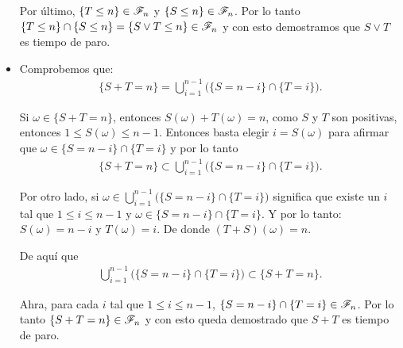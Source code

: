 \begin{itemize}
			Por último, ${\{ T \leq n \} \in \mathscr{F}_n}$ y ${\{ S \leq n \} \in \mathscr{F}_n}$. Por lo tanto	\\	
			${\{ T \leq n \} \cap \{ S \leq n\} = \{ S \vee T \leq n \} \in \mathscr{F}_n}$ y con esto demostramos que 
			${ S \vee T}$ es tiempo de paro.\\
			
		\item
			Comprobemos que:
			\begin{align}
				\{ S + T = n \} = \bigcup_{i = 1}^{n-1} \bigg( \{S = n - i\} \cap \{T = i\} \bigg).
			\end{align}
			
			Si ${\omega \in \{ S + T = n \}}$, entonces ${S(\omega) + T(\omega) = n}$, como ${S}$ y ${T}$ son positivas,
			entonces ${1 \leq S(\omega) \leq n-1}$. Entonces basta elegir ${i = S(\omega)}$ para afirmar que 
			${\omega \in \{S = n - i\} \cap \{T = i\}}$ y por lo tanto
			\begin{align}
			\{ S + T = n \} \subset \bigcup_{i = 1}^{n-1} \bigg( \{S = n - i\} \cap \{T = i\} \bigg).
			\end{align}
			
			Por otro lado, si ${\omega \in \bigcup_{i = 1}^{n-1} \bigg( \{S = n - i\} \cap \{T = i\} \bigg)}$
			significa que existe un ${i}$ tal que ${1\leq i \leq n-1}$ y ${\omega \in \{S = n - i\} \cap \{T = i\}}$.
			Y por lo tanto: ${S(\omega) = n-i}$ y ${T(\omega) = i}$. De donde ${(T + S)(\omega) = n}$.
			
			De aquí que
			\begin{align}
				\bigcup_{i = 1}^{n-1} \bigg( \{S = n - i\} \cap \{T = i\} \bigg) \subset \{ S + T = n \}. 
			\end{align}
			
			Ahra, para cada ${i}$ tal que ${1 \leq i \leq n-1}$, ${\{S = n - i\} \cap \{T = i\} \in \mathscr{F}_n}$.
			Por lo tanto ${\{ S + T = n\} \in \mathscr{F}_n}$ y con esto queda demostrado que ${ S + T }$ es tiempo de paro.
	\end{itemize}
	